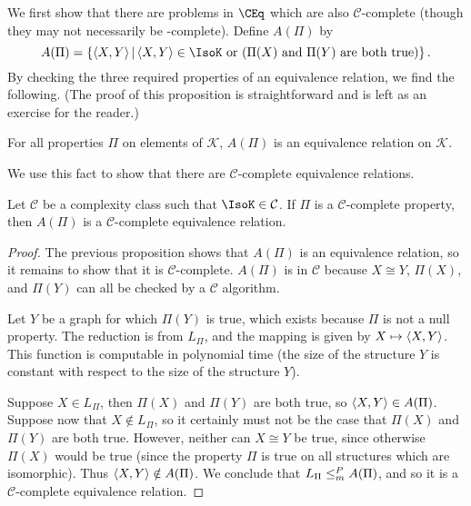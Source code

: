 We first show that there are problems in $\CEq$ which are also $\mathcal{C}$-complete (though they may not necessarily be \CEq-complete).
Define $A(\Pi)$ by
\begin{displaymath}
  A(\Pi) = \lb \pair{X}{Y}\st \pair{X}{Y}\in\IsoK \plain{or} (\Pi(X) \plain{and} \Pi(Y) \text{ are both true})\rb.
\end{displaymath}
By checking the three required properties of an equivalence relation, we find the following.
(The proof of this proposition is straightforward and is left as an exercise for the reader.)
\begin{proposition}
  For all properties $\Pi$ on elements of $\mathcal{K}$, $A(\Pi)$ is an equivalence relation on $\mathcal{K}$.
\end{proposition}
We use this fact to show that there are $\mathcal{C}$-complete equivalence relations.
\begin{proposition}\label{prop:APi}
  Let $\mathcal{C}$ be a complexity class such that $\IsoK\in\mathcal{C}$.
  If $\Pi$ is a $\mathcal{C}$-complete property, then $A(\Pi)$ is a $\mathcal{C}$-complete equivalence relation.
\end{proposition}
\begin{proof}
  The previous proposition shows that $A(\Pi)$ is an equivalence relation, so it remains to show that it is $\mathcal{C}$-complete.
  $A(\Pi)$ is in $\mathcal{C}$ because $X\cong Y$, $\Pi(X)$, and $\Pi(Y)$ can all be checked by a $\mathcal{C}$ algorithm.

  Let $Y$ be a graph for which $\Pi(Y)$ is true, which exists because $\Pi$ is not a null property.
  The reduction is from $L_\Pi$, and the mapping is given by $X\mapsto\left\langle X,Y\right\rangle$.
  This function is computable in polynomial time (the size of the structure $Y$ is constant with respect to the size of the structure $Y$).

  Suppose $X\in L_\Pi$, then $\Pi(X)$ and $\Pi(Y)$ are both true, so $\left\langle X,Y\right\rangle\in A(\Pi)$.
  Suppose now that $X\notin L_\Pi$, so it certainly must not be the case that $\Pi(X)$ and $\Pi(Y)$ are both true.
  However, neither can $X\cong Y$ be true, since otherwise $\Pi(X)$ would be true (since the property $\Pi$ is true on all structures which are isomorphic).
  Thus $\left\langle X,Y\right\rangle\notin A(\Pi)$.
  We conclude that $L_\Pi\leq^{P}_{m} A(\Pi)$, and so it is a $\mathcal{C}$-complete equivalence relation.
\end{proof}

